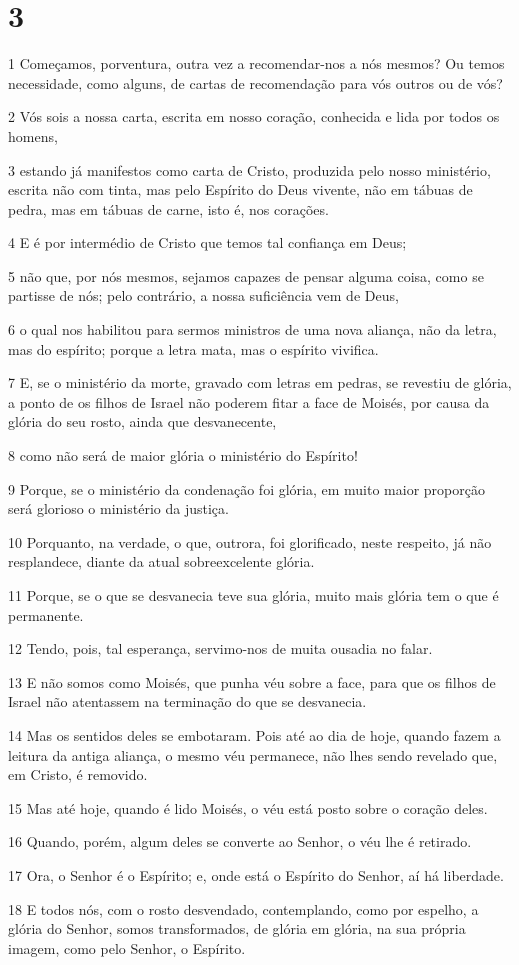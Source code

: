 \chapter{3}

\par 1 Começamos, porventura, outra vez a recomendar-nos a nós mesmos? Ou temos necessidade, como alguns, de cartas de recomendação para vós outros ou de vós?
\par 2 Vós sois a nossa carta, escrita em nosso coração, conhecida e lida por todos os homens,
\par 3 estando já manifestos como carta de Cristo, produzida pelo nosso ministério, escrita não com tinta, mas pelo Espírito do Deus vivente, não em tábuas de pedra, mas em tábuas de carne, isto é, nos corações.
\par 4 E é por intermédio de Cristo que temos tal confiança em Deus;
\par 5 não que, por nós mesmos, sejamos capazes de pensar alguma coisa, como se partisse de nós; pelo contrário, a nossa suficiência vem de Deus,
\par 6 o qual nos habilitou para sermos ministros de uma nova aliança, não da letra, mas do espírito; porque a letra mata, mas o espírito vivifica.
\par 7 E, se o ministério da morte, gravado com letras em pedras, se revestiu de glória, a ponto de os filhos de Israel não poderem fitar a face de Moisés, por causa da glória do seu rosto, ainda que desvanecente,
\par 8 como não será de maior glória o ministério do Espírito!
\par 9 Porque, se o ministério da condenação foi glória, em muito maior proporção será glorioso o ministério da justiça.
\par 10 Porquanto, na verdade, o que, outrora, foi glorificado, neste respeito, já não resplandece, diante da atual sobreexcelente glória.
\par 11 Porque, se o que se desvanecia teve sua glória, muito mais glória tem o que é permanente.
\par 12 Tendo, pois, tal esperança, servimo-nos de muita ousadia no falar.
\par 13 E não somos como Moisés, que punha véu sobre a face, para que os filhos de Israel não atentassem na terminação do que se desvanecia.
\par 14 Mas os sentidos deles se embotaram. Pois até ao dia de hoje, quando fazem a leitura da antiga aliança, o mesmo véu permanece, não lhes sendo revelado que, em Cristo, é removido.
\par 15 Mas até hoje, quando é lido Moisés, o véu está posto sobre o coração deles.
\par 16 Quando, porém, algum deles se converte ao Senhor, o véu lhe é retirado.
\par 17 Ora, o Senhor é o Espírito; e, onde está o Espírito do Senhor, aí há liberdade.
\par 18 E todos nós, com o rosto desvendado, contemplando, como por espelho, a glória do Senhor, somos transformados, de glória em glória, na sua própria imagem, como pelo Senhor, o Espírito.


